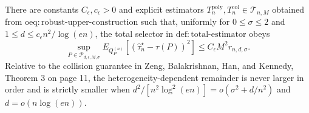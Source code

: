 There are constants \(C_{\epsilon},c_{\epsilon}>0\) and explicit estimators \(T_n^{\mathrm{poly}},T_n^{\mathrm{col}}\in\mathcal T_{n,M}\) obtained from \(\mathrm{oeq:robust\text{-}upper\text{-}construction}\) such that, uniformly for \(0\le\sigma\le2\) and \(1\le d\le c_{\epsilon}n^2/\log(en)\), the total selector in \(\mathrm{def:total\text{-}estimator}\) obeys \[\sup_{P\in\mathcal P_{d,\epsilon,M,\sigma}}E_{Q_P^{(n)}}[(\widehat\tau_n^{\star}-\tau(P))^2]\le C_{\epsilon}M^2r_{n,d,\sigma}.\] Relative to the collision guarantee in Zeng, Balakrishnan, Han, and Kennedy, Theorem 3 on page 11, the heterogeneity-dependent remainder is never larger in order and is strictly smaller when \(d^2/[n^2\log^2(en)]=o(\sigma^2+d/n^2)\) and \(d=o(n\log(en))\).